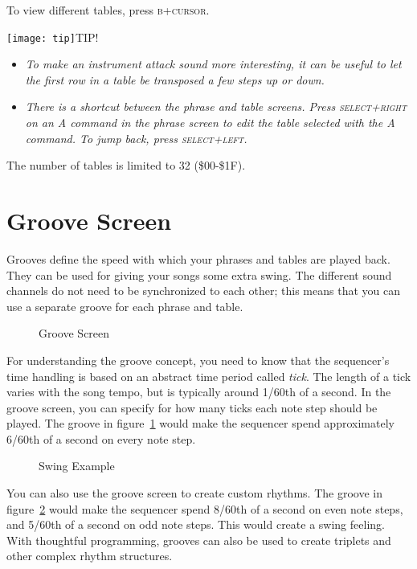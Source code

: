 To view different tables, press \textsc{b+cursor}.

\texttt{[image: tip]}TIP!
\begin{itemize}
	\item \textit{To make an instrument attack sound more interesting, it can be useful to let the first row in a table be transposed a few steps up or down.}
	\item \textit{There is a shortcut between the phrase and table screens. Press \textsc{select+right} on an A command in the phrase screen to edit the table selected with the A command. To jump back, press \textsc{select+left}.}
\end{itemize}

The number of tables is limited to 32 (\$00-\$1F).

\section{Groove Screen}

Grooves define the speed with which your phrases and tables are played back. They can be used for giving your songs some extra swing. The different sound channels do not need to be synchronized to each other; this means that you can use a separate groove for each phrase and table.

\begin{figure}[htbp]
	\begin{center}
	\end{center}
	\caption{Groove Screen}
	\label{fig:groove}
\end{figure}

For understanding the groove concept, you need to know that the sequencer's time handling is based on an abstract time period called \emph{tick}. The length of a tick varies with the song tempo, but is typically around 1/60th of a second. In the groove screen, you can specify for how many ticks each note step should be played.
The groove in figure~\ref{fig:groove} would make the sequencer spend approximately 6/60th of a second on every note step.

\begin{figure}[htbp]
	\begin{center}
	\end{center}
	\caption{Swing Example}
	\label{fig:groove-swing}
\end{figure}

You can also use the groove screen to create custom rhythms. The groove in figure~\ref{fig:groove-swing} would make the sequencer spend 8/60th of a second on even note steps, and 5/60th of a second on odd note steps. This would create a swing feeling. With thoughtful programming, grooves can also be used to create triplets and other complex rhythm structures.

